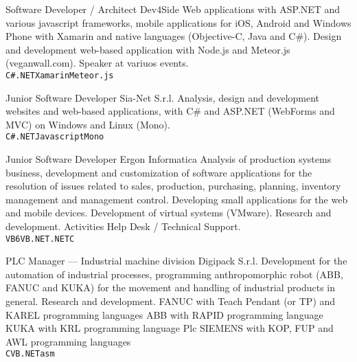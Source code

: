 \documentclass[9pt]{developercv}
\begin{document}
\begin{entrylist}
		{Software Developer / Architect}
		{Dev4Side}
		{Web applications with ASP.NET and various javascript frameworks, mobile applications for iOS, Android and Windows Phone with Xamarin and native languages (Objective-C, Java and C\#). Design and development web-based application with Node.js and Meteor.js (veganwall.com). Speaker at variuos events. \\
	   \texttt{C\#}\slashsep\texttt{.NET}\slashsep\texttt{Xamarin}\slashsep\texttt{Meteor.js}}

		{Junior Software Developer}
		{Sia-Net S.r.l.}
		{Analysis, design and development websites and web-based applications, with C\# and ASP.NET (WebForms and MVC) on Windows and Linux (Mono). \\
	   \texttt{C\#}\slashsep\texttt{.NET}\slashsep\texttt{Javascript}\slashsep\texttt{Mono}}

		{Junior Software Developer}
		{Ergon Informatica}
		{Analysis of production systems business, development and customization of software applications for the resolution of issues related to sales, production, purchasing, planning, inventory management and management control. Developing small applications for the web and mobile devices. Development of virtual systems (VMware). Research and development. Activities Help Desk / Technical Support. \\
	   \texttt{VB6}\slashsep\texttt{VB.NET}\slashsep\texttt{.NET}\slashsep\texttt{C}}

		{PLC Manager --- Industrial machine division}
		{Digipack S.r.l.}
		{Development for the automation of industrial processes, programming anthropomorphic robot (ABB, FANUC and KUKA) for the movement and handling of industrial products in general. Research and development. FANUC with Teach Pendant (or TP) and KAREL programming languages ABB with RAPID programming language KUKA with KRL programming language Plc SIEMENS with KOP, FUP and AWL programming languages \\
	   \texttt{C}\slashsep\texttt{VB.NET}\slashsep\texttt{asm}}

\end{entrylist}
\end{document}
